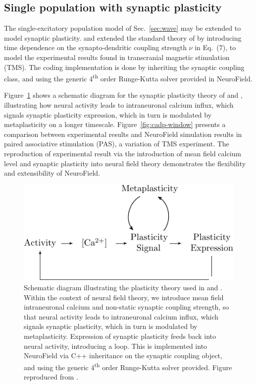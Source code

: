 \documentclass[preprint,review,10pt,authoryear,letterpaper]{elsarticle}
\begin{document}

\subsection{Single population with synaptic plasticity}
\label{sec:cadp}

The single-excitatory population model of Sec.~\ref{sec:wave} may be extended to model synaptic plasticity. \citet{fung13} and \citet{fung14} extended the standard theory of \citet{Robinson2005} by introducing time dependence on the synapto-dendritic coupling strength \(\nu\) in Eq.~(7), to model the experimental results found in transcranial magnetic stimulation (TMS). The coding implementation is done by inheriting the synaptic coupling class, and using the generic 4\textsuperscript{th} order Runge-Kutta solver provided in NeuroField.

Figure~\ref{fig:cadp} shows a schematic diagram for the synaptic plasticity theory of \citet{fung13} and \citet{fung14}, illustrating how neural activity leads to intraneuronal calcium influx, which signals synaptic plasticity expression, which in turn is modulated by metaplasticity on a longer timescale. Figure~\ref{fig:cadp-window} presents a comparison between experimental results and NeuroField simulation results in paired associative stimulation (PAS), a variation of TMS experiment. The reproduction of experimental result via the introduction of mean field calcium level and synaptic plasticity into neural field theory demonstrates the flexibility and extensibility of NeuroField.

\begin{figure}[t]
\begin{center}
\includegraphics[width=.7\textwidth]{bcm-schematic}
\caption{Schematic diagram illustrating the plasticity theory used in \citet{fung13} and \citet{fung14}. Within the context of neural field theory, we introduce mean field intraneuronal calcium and non-static synaptic coupling strength, so that neural activity leads to intraneuronal calcium influx, which signals synaptic plasticity, which in turn is modulated by metaplasticity. Expression of synaptic plasticity feeds back into neural activity, introducing a loop. This is implemented into NeuroField via C++ inheritance on the synaptic coupling object, and using the generic 4\textsuperscript{th} order Runge-Kutta solver provided. Figure reproduced from \citet{fung14}.}
\label{fig:cadp}
\end{center}
\end{figure}
\end{document}
